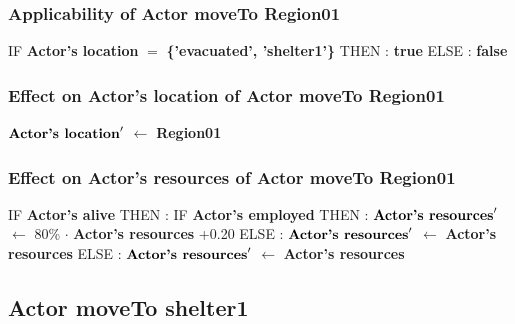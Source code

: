 \documentclass{article}%
\begin{document}
%
\subsubsection{Applicability of Actor moveTo Region01}%
\label{ssubsec:Applicability of Actor moveTo Region01}%
\begin{flushleft}%
IF %
\textbf{Actor's location}%
$=$%
\textbf{\{'evacuated', 'shelter1'\}}%
\linebreak%
\hspace*{2em}%
THEN %
: %
\textbf{true}%
\linebreak%
\hspace*{2em}%
ELSE %
: %
\textbf{false}%
\end{flushleft}

%
\subsubsection{Effect on Actor's location of Actor moveTo Region01}%
\label{ssubsec:Effect on Actor's location of Actor moveTo Region01}%
\begin{flushleft}%
$\mbox{\textbf{Actor's location}} '$%
$\leftarrow$%
\textbf{Region01}%
\end{flushleft}

%
\subsubsection{Effect on Actor's resources of Actor moveTo Region01}%
\label{ssubsec:Effect on Actor's resources of Actor moveTo Region01}%
\begin{flushleft}%
IF %
\textbf{Actor's alive}%
\linebreak%
\hspace*{2em}%
THEN %
: %
IF %
\textbf{Actor's employed}%
\linebreak%
\hspace*{4em}%
THEN %
: %
$\mbox{\textbf{Actor's resources}} '$%
$\leftarrow$%
80\%%
$\cdot$%
\textbf{Actor's resources}%
+0.20%
\linebreak%
\hspace*{4em}%
ELSE %
: %
$\mbox{\textbf{Actor's resources}} '$%
$\leftarrow$%
\textbf{Actor's resources}%
\linebreak%
\hspace*{2em}%
ELSE %
: %
$\mbox{\textbf{Actor's resources}} '$%
$\leftarrow$%
\textbf{Actor's resources}%
\end{flushleft}

%
\subsection{Actor moveTo shelter1}%
\label{subsec:Actor moveTo shelter1}%
\end{document}
